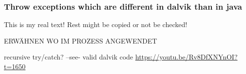 \subsubsection{Throw exceptions which are different in dalvik than in java} \label{subsubsection:counter-reengineering-break-exception}
This is my real text! Rest might be copied or not be checked!

ERWÄHNEN WO IM PROZESS ANGEWENDET\newline


recursive try/catch? --see- valid dalvik code\newline
\url{https://youtu.be/Rv8DfXNYnOI?t=1650}
